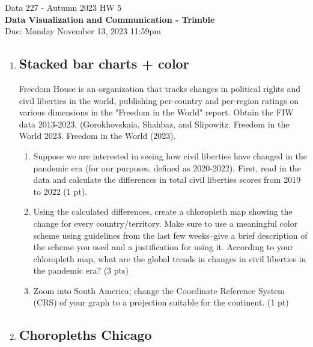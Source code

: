 \documentclass[]{book}
\theoremstyle{definition}
\begin{document}
\begin{center}
{\Large Data 227 - Autumn 2023 \hspace{0.5cm} HW 5}\\
\textbf{Data Visualization and Communication - Trimble}\\ %
Due: Monday November 13, 2023  11:59pm   
\end{center}

\vspace{0.2 cm}

\begin{enumerate}

\item
\subsection*{Stacked bar charts + color}

Freedom House is an organization that tracks changes in political rights and civil liberties in the world, publishing per-country and per-region ratings on various dimensions in the "Freedom in the World" report.   Obtain the FIW data 2013-2023.  
(Gorokhovskaia, Shahbaz, and Slipowitz.  Freedom in the World 2023. Freedom in the World (2023).

\begin {enumerate} 
\item Suppose we are interested in seeing how civil liberties have changed in the pandemic era (for our purposes, defined as 2020-2022). First, read in the data and calculate the differences in total civil liberties scores from 2019 to 2022 (1 pt).
\item Using the calculated differences, create a chloropleth map showing the change for every country/territory. Make sure to use a meaningful color scheme using guidelines from the last few weeks–give a brief description of the scheme you used and a justification for using it. According to your chloropleth map, what are the global trends in changes in civil liberties in the pandemic era? (3 pts)
\item  Zoom into South America; change the Coordinate Reference System (CRS) of your graph to a projection suitable for the continent. (1 pt)
\end{enumerate}

\item
\subsection*{Choropleths Chicago}


\end{enumerate}
\end{document}
